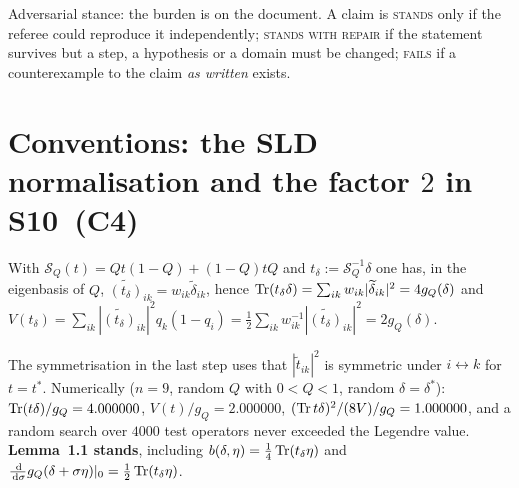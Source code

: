 \documentclass[11pt]{article}
\newcommand{\SLD}{\mathcal S_Q}
\begin{document}
Adversarial stance: the burden is on the document.  A claim is \textsc{stands} only if the
referee could reproduce it independently; \textsc{stands with repair} if the statement
survives but a step, a hypothesis or a domain must be changed; \textsc{fails} if a
counterexample to the claim \emph{as written} exists.

\section{Conventions: the SLD normalisation and the factor $2$ in S10~(C4)}\label{sec:norm}

\begin{lemma}\label{lem:norm}
With $\SLD(t)=Qt(1-Q)+(1-Q)tQ$ and $t_\delta:=\SLD^{-1}\delta$ one has, in the
eigenbasis of $Q$, $\widetilde{(t_\delta)}_{ik}=w_{ik}\widetilde\delta_{ik}$, hence
$\operatorname{Tr}(t_\delta\delta)=\sum_{ik}w_{ik}|\widetilde\delta_{ik}|^2=4g_Q(\delta)$ and
$V(t_\delta)=\sum_{ik}|\widetilde{(t_\delta)}_{ik}|^2q_k(1-q_i)
=\tfrac12\sum_{ik}w_{ik}^{-1}|\widetilde{(t_\delta)}_{ik}|^2=2g_Q(\delta)$.
\end{lemma}
The symmetrisation in the last step uses that $|\widetilde t_{ik}|^2$ is symmetric under
$i\leftrightarrow k$ for $t=t^*$.  Numerically ($n=9$, random $Q$ with $0<Q<1$, random
$\delta=\delta^*$): $\operatorname{Tr}(t\delta)/g_Q=4.000000$, $V(t)/g_Q=2.000000$,
$(\operatorname{Tr} t\delta)^2/(8V)/g_Q=1.000000$, and a random search over $4000$ test operators never
exceeded the Legendre value.  \textbf{Lemma~1.1 stands}, including
$b(\delta,\eta)=\frac14\operatorname{Tr}(t_\delta\eta)$ and
$\frac{\,\mathrm d}{\,\mathrm d\sigma}g_Q(\delta+\sigma\eta)|_0=\frac12\operatorname{Tr}(t_\delta\eta)$.
\end{document}
